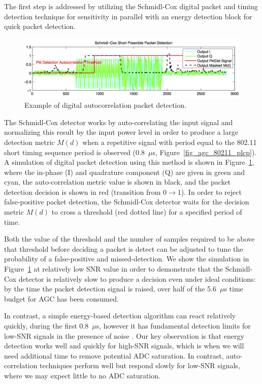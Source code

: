 	The first step is addressed by utilizing the Schmidl-Cox digital packet and timing detection technique \cite{schmidl1997robust} for sensitivity in parallel with an energy detection block for quick packet detection.
	
\begin{figure}[ht] %
\centering
\includegraphics[width=1\linewidth]{./figs/agc/agc_schmidtl_cox_autocorrelation}
\caption{Example of digital autocorrelation packet detection.}
\label{fig_agc_autocorr}
\end{figure}
	
	The Schmidl-Cox detector works by auto-correlating the input signal and normalizing this result by the input power level in order to produce a large detection metric $M(d)$ when a repetitive signal with period equal to the 802.11 short timing sequence period is observed (0.8~$\mu$s, Figure~\ref{fig_agc_80211_plcp}).
	A simulation of digital packet detection using this method is shown in Figure~\ref{fig_agc_autocorr}, where the in-phase (I) and quadrature component (Q) are given in green and cyan, the auto-correlation metric value is shown in black, and the packet detection decision is shown in red (transition from $0 \rightarrow 1$).
	In order to reject false-positive packet detection, the Schmidl-Cox detector waits for the decision metric $M(d)$ to cross a threshold (red dotted line) for a specified period of time.
	
	Both the value of the threshold and the number of samples required to be above that threshold before deciding a packet is detect can be adjusted to tune the probability of a false-positive and missed-detection.
	We show the simulation in Figure~\ref{fig_agc_autocorr} at relatively low \ac{SNR} value in order to demonstrate that the Schmidl-Cox detector is relatively slow to produce a decision even under ideal conditions: by the time the packet detection signal is raised, over half of the 5.6~$\mu$s time budget for \ac{AGC} has been consumed.
	
	In contrast, a simple energy-based detection algorithm can react relatively quickly, during the first 0.8~$\mu$s, however it has fundamental detection limits for low-\ac{SNR} signals in the presence of noise \cite{shellhammer2006performance}.
	Our key observation is that energy detection works well and quickly for high-\ac{SNR} signals, which is when we will need additional time to remove potential \ac{ADC} saturation.
	In contrast, auto-correlation techniques perform well but respond slowly for low-\ac{SNR} signals, where we may expect little to no \ac{ADC} saturation.
	

